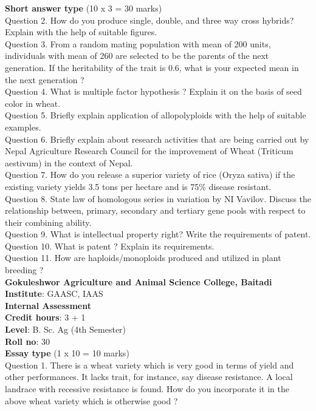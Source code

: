 \documentclass[12pt]{article}\usepackage[]{graphicx}\usepackage[]{color}
\begin{document}
\textbf{Short answer type} (10 x 3 = 30 marks) \\
Question 2. How do you produce single, double, and three way cross hybrids? Explain with the help of suitable figures.\\
Question 3. From a random mating population with mean of 200 units, individuals with mean of 260 are selected to be the parents of the next generation. If the heritability of the trait is 0.6, what is your expected mean in the next generation ?\\
Question 4. What is multiple factor hypothesis ? Explain it on the basis of seed color in wheat.\\
Question 5. Briefly explain application of allopolyploids with the help of suitable examples.\\
Question 6. Briefly explain about research activities that are being carried out by Nepal Agriculture Research Council for the improvement of Wheat (Triticum aestivum) in the context of Nepal.\\
Question 7. How do you release a superior variety of rice (Oryza sativa) if the existing variety yields 3.5 tons per hectare and is 75\% disease resistant.\\
Question 8. State law of homologous series in variation by NI Vavilov. Discuss the relationship between, primary, secondary and tertiary gene pools with respect to their combining ability.\\
Question 9. What is intellectual property right? Write the requirements of patent.\\
Question 10. What is patent ? Explain its requirements.\\
Question 11. How are haploids/monoploids produced and utilized in plant breeding ?\\
\clearpage 
{\centering \Large{\textbf{Gokuleshwor Agriculture and Animal Science College, Baitadi}} \\[0.25cm]
            \textbf{Institute}: GAASC, IAAS \\[0.2cm]
            \textbf{Internal Assessment} \\[0.2cm]} 
\textbf{Credit hours}: 3 + 1 \\ 
\textbf{Level}: B. Sc. Ag (4th Semester) \\
\textbf{Roll no}: 30 \\[0.5cm] 
\textbf{Essay type} (1 x 10 = 10 marks) \\
Question 1. There is a wheat variety which is very good in terms of yield and other performances. It lacks trait, for instance, say disease resistance. A local landrace with recessive resistance is found. How do you incorporate it in the above wheat variety which is otherwise good ?\\
\end{document}
